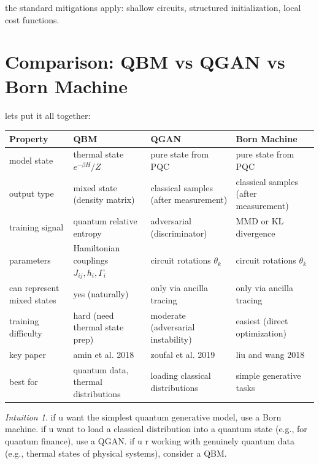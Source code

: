 \documentclass[11pt,a4paper]{article}
\theoremstyle{definition}
\theoremstyle{remark}
\newtheorem*{intuition}{Intuition}
\begin{document}
the standard mitigations apply: shallow circuits, structured initialization, local cost functions.

\section{Comparison: QBM vs QGAN vs Born Machine}

lets put it all together:

\begin{center}
\renewcommand{\arraystretch}{1.4}
\begin{tabular}{|p{3cm}|p{3.5cm}|p{3.5cm}|p{3.5cm}|}
\hline
\textbf{Property} & \textbf{QBM} & \textbf{QGAN} & \textbf{Born Machine} \\
\hline
model state & thermal state $e^{-\beta H}/Z$ & pure state from PQC & pure state from PQC \\
\hline
output type & mixed state (density matrix) & classical samples (after measurement) & classical samples (after measurement) \\
\hline
training signal & quantum relative entropy & adversarial (discriminator) & MMD or KL divergence \\
\hline
parameters & Hamiltonian couplings $J_{ij}, h_i, \Gamma_i$ & circuit rotations $\theta_k$ & circuit rotations $\theta_k$ \\
\hline
can represent mixed states & yes (naturally) & only via ancilla tracing & only via ancilla tracing \\
\hline
training difficulty & hard (need thermal state prep) & moderate (adversarial instability) & easiest (direct optimization) \\
\hline
key paper & amin et al. 2018 & zoufal et al. 2019 & liu and wang 2018 \\
\hline
best for & quantum data, thermal distributions & loading classical distributions & simple generative tasks \\
\hline
\end{tabular}
\end{center}

\begin{intuition}
if u want the simplest quantum generative model, use a Born machine. if u want to load a classical distribution into a quantum state (e.g., for quantum finance), use a QGAN. if u r working with genuinely quantum data (e.g., thermal states of physical systems), consider a QBM.
\end{intuition}
\end{document}
